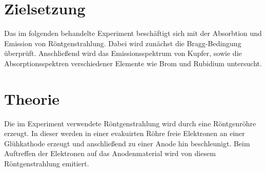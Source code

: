 \section{Zielsetzung}
\label{sec:zielsetzung}
Das im folgenden behandelte Experiment beschäftigt sich mit der Absorbtion und Emission von Röntgenstrahlung. Dabei wird zunächst die Bragg-Bedingung 
überprüft. Anschließend wird das Emissionsspektrum von Kupfer, sowie die Absorptionsspektren verschiedener Elemente wie Brom und Rubidium untersucht.
\section{Theorie}
\label{sec:theorie}
Die im Experiment verwendete Röntgenstrahlung wird durch eine Röntgenröhre erzeugt. In dieser werden in einer evakuirten Röhre freie Elektronen an einer Glühkathode erzeugt und anschließend zu einer Anode hin beschleunigt. Beim Auftreffen der Elektronen auf das Anodenmaterial wird von diesem Röntgenstrahlung emitiert.
